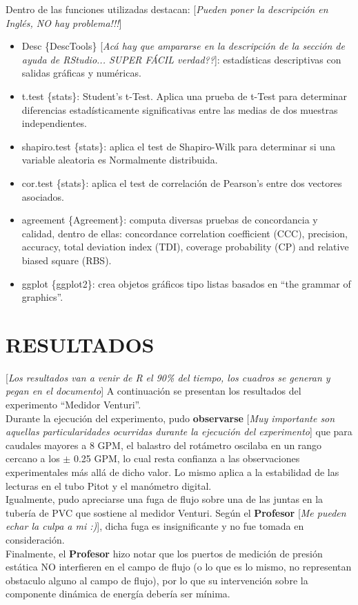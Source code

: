 \documentclass[11pt, letterpaper]{article}
\begin{document}
Dentro de las funciones utilizadas destacan: [\emph{Pueden poner la descripción en Inglés, NO hay problema!!!}]

\begin{itemize}
\item Desc \{DescTools\} [\emph{Acá hay que ampararse en la descripción de la sección de ayuda de RStudio... SUPER FÁCIL verdad??}]: estadísticas descriptivas con salidas gráficas y numéricas.
\item t.test \{stats\}: Student's t-Test. Aplica una prueba de t-Test para determinar diferencias estadísticamente significativas entre las medias de dos muestras independientes. 
\item shapiro.test \{stats\}: aplica el test de Shapiro-Wilk para determinar si una variable aleatoria es Normalmente distribuida.
\item cor.test \{stats\}: aplica el test de correlación de Pearson's entre dos vectores asociados.
\item agreement \{Agreement\}: computa diversas pruebas de concordancia y calidad, dentro de ellas: concordance correlation coefficient (CCC), precision, accuracy, total deviation index (TDI), coverage probability (CP) and relative biased square (RBS).
\item ggplot \{ggplot2\}: crea objetos gráficos tipo listas basados en “the grammar of graphics”.
\end{itemize}

\pagebreak

\section{RESULTADOS}

[\emph{Los resultados van a venir de R el 90\% del tiempo, los cuadros se generan y pegan en el documento}]
A continuación se presentan los resultados del experimento “Medidor Venturi”.\\ 
Durante la ejecución del experimento, pudo \textbf{observarse} [\emph{Muy importante son aquellas particularidades ocurridas durante la ejecución del experimento}] que para caudales mayores a 8 GPM, el balastro del rotámetro oscilaba en un rango cercano a los $\pm$ 0.25 GPM, lo cual resta confianza a las observaciones experimentales más allá de dicho valor. Lo mismo aplica a la estabilidad de las lecturas en el tubo Pitot y el manómetro digital.\\
Igualmente, pudo apreciarse una fuga de flujo sobre una de las juntas en la tubería de PVC que sostiene al medidor Venturi. Según el \textbf{Profesor} [\emph{Me pueden echar la culpa a mi :)}], dicha fuga es insignificante y no fue tomada en consideración.\\ 
Finalmente, el \textbf{Profesor} hizo notar que los puertos de medición de presión estática NO interfieren en el campo de flujo (o lo que es lo mismo, no representan obstaculo alguno al campo de flujo), por lo que su intervención sobre la componente dinámica de energía debería ser mínima.\\
\end{document}
